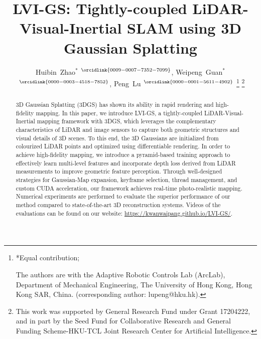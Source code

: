\documentclass[lettersize,journal]{IEEEtran}
\begin{document}
\title{LVI-GS: Tightly-coupled LiDAR-Visual-Inertial SLAM using 3D Gaussian Splatting}

\author{Huibin~Zhao$^{*}$\hspace{-1.5mm}$^{~\orcidlink{0009-0007-7352-7099}}$, Weipeng~Guan$^{*}$\hspace{-1.5mm}$^{~\orcidlink{0000-0003-4518-7852}}$,   Peng~Lu\hspace{-1.5mm}$^{~\orcidlink{0000-0001-5611-4902}}$  %
    \thanks{
        *Equal contribution; 
    
        The authors are with the Adaptive Robotic Controls Lab (ArcLab), Department of Mechanical Engineering, The University of Hong Kong, Hong Kong SAR, China.
        (corresponding author: lupeng@hku.hk). 
        }%
    \thanks{
        This work was supported by General Research Fund under Grant 17204222, and in part by the Seed Fund for Collaborative Research and General Funding Scheme-HKU-TCL Joint Research Center for Artificial Intelligence.
        }%
}



\maketitle

\begin{abstract}

3D Gaussian Splatting (3DGS) has shown its ability in rapid rendering and high-fidelity mapping.
In this paper, we introduce LVI-GS, a tightly-coupled LiDAR-Visual-Inertial mapping framework with 3DGS, which leverages the complementary characteristics of LiDAR and image sensors to capture both geometric structures and visual details of 3D scenes.
To this end, the 3D Gaussians are initialized from colourized LiDAR points and optimized using differentiable rendering.
In order to achieve high-fidelity mapping, we introduce a pyramid-based training approach to effectively learn multi-level features and incorporate depth loss derived from LiDAR measurements to improve geometric feature perception.
Through well-designed strategies for Gaussian-Map expansion, keyframe selection, thread management, and custom CUDA acceleration, our framework achieves real-time photo-realistic mapping.
Numerical experiments are performed to evaluate the superior performance of our method compared to state-of-the-art 3D reconstruction systems.
Videos of the evaluations can be found on our website: \url{https://kwanwaipang.github.io/LVI-GS/}.
\end{abstract}
\end{document}
